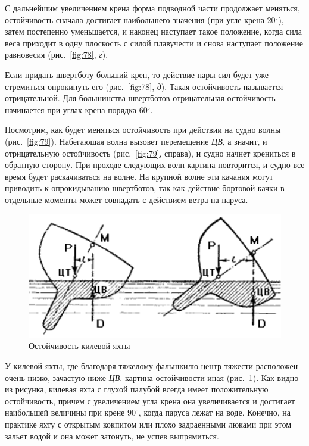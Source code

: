 \documentclass[a4paper, 12pt, twoside, final]{scrbook}
\begin{document}
С дальнейшим увеличением крена форма подводной части продолжает меняться, остойчивость сначала достигает наибольшего значения (при угле крена 20$^\circ$), затем постепенно уменьшается, и наконец наступает такое положение, когда сила веса приходит в одну плоскость с силой плавучести и снова наступает положение равновесия (рис.~\ref{fig:78}, \textit{г}).

Если придать швертботу больший крен, то действие пары сил будет уже стремиться опрокинуть его (рис.~\ref{fig:78}, \textit{д}). Такая остойчивость называется отрицательной. Для большинства швертботов отрицательная остойчивость начинается при углах крена порядка 60$^\circ$.

Посмотрим, как будет меняться остойчивость при действии на судно волны (рис.~\ref{fig:79}). Набегающая волна вызовет перемещение \textit{ЦВ}, а значит, и отрицательную остойчивость (рис.~\ref{fig:79}, справа), и судно начнет крениться в обратную сторону. При проходе следующих волн картина повторится, и судно все время будет раскачиваться на волне. На крупной волне эти качания могут приводить к опрокидыванию швертботов, так как действие бортовой качки в отдельные моменты может совпадать с действием ветра на паруса. 

\begin{figure}
   \centering
   \includegraphics{80_Ostojchevost_kilevoj_yakhty} %
   \caption{Остойчивость килевой яхты}
   \label{fig:80}
\end{figure}

У килевой яхты, где благодаря тяжелому фальшкилю центр тяжести расположен очень низко, зачастую ниже \textit{ЦВ}. картина остойчивости иная (рис.~\ref{fig:80}). Как видно из рисунка, килевая яхта с глухой палубой всегда имеет положительную остойчивость, причем с увеличением угла крена она увеличивается и достигает наибольшей величины при крене $90^\circ$, когда паруса лежат на воде. Конечно, на практике яхту с открытым кокпитом или плохо задраенными люками при этом зальет водой и она может затонуть, не успев выпрямиться.
\end{document}
